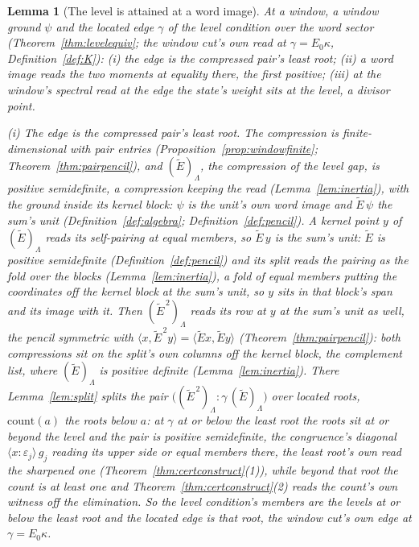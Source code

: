 \documentclass[11pt]{article}
\newtheorem{lemma}{Lemma}
\theoremstyle{definition}
\begin{document}
\begin{lemma}[The level is attained at a word image]\label{lem:attained}
At a window, a window ground $\psi$ and the located edge $\gamma$ of
the level condition over the word sector
(Theorem~\ref{thm:levelequiv}; the window cut's own read at
$\gamma=E_0\kappa$, Definition~\ref{def:K}): \emph{(i)} the edge is
the compressed pair's least root; \emph{(ii)} a word image reads the
two moments at equality there, the first positive; \emph{(iii)} at
the window's spectral read at the edge the state's weight sits at
the level, a divisor point.

\emph{(i) The edge is the compressed pair's least root.} The compression
is finite-dimensional with pair entries
(Proposition~\ref{prop:windowfinite}; Theorem~\ref{thm:pairpencil}),
and $(\tilde E)_\Lambda$, the compression of the level gap, is
positive semidefinite, a compression keeping the read
(Lemma~\ref{lem:inertia}), with the ground inside its kernel block:
$\psi$ is the unit's own word image and $\tilde E\,\psi$ the sum's
unit (Definition~\ref{def:algebra}; Definition~\ref{def:pencil}). A
kernel point $y$ of $(\tilde E)_\Lambda$ reads its self-pairing at
equal members, so $\tilde E\,y$ is the sum's unit: $\tilde E$ is
positive semidefinite (Definition~\ref{def:pencil}) and its split
reads the pairing as the fold over the blocks
(Lemma~\ref{lem:inertia}), a fold of equal members putting the
coordinates off the kernel block at the sum's unit, so $y$ sits in
that block's span and its image with it. Then
$(\tilde E^{\,2})_\Lambda$ reads its row at $y$ at the sum's unit as
well, the pencil symmetric with
$\langle x,\tilde E^{\,2}y\rangle=\langle\tilde Ex,\tilde Ey\rangle$
(Theorem~\ref{thm:pairpencil}): both compressions sit on the
split's own columns off the kernel block, the complement list,
where $(\tilde E)_\Lambda$ is positive
definite (Lemma~\ref{lem:inertia}). There Lemma~\ref{lem:split}
splits the pair
$\big((\tilde E^{\,2})_\Lambda:\gamma\,(\tilde E)_\Lambda\big)$ over
located roots, $\mathrm{count}(a)$ the roots below $a$: at $\gamma$
at or below the least root the roots sit at or beyond the level and
the pair is positive semidefinite, the congruence's diagonal
$\langle x\!:\!\varepsilon_j\rangle\,g_j$ reading its upper side or
equal members there, the least root's own read the sharpened one
(Theorem~\ref{thm:certconstruct}(1)),
while beyond that root the count is at least one and
Theorem~\ref{thm:certconstruct}(2) reads the count's own witness off
the elimination. So the level condition's
members are the levels at or below the least root and the located
edge is that root, the window cut's own edge at $\gamma=E_0\kappa$.


\end{lemma}
\end{document}
